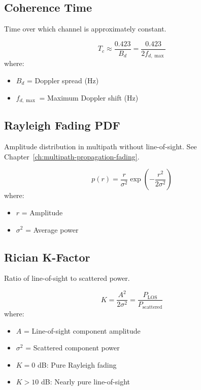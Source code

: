 \subsection{Coherence Time}
\label{sec:coherence-time}

Time over which channel is approximately constant.

\begin{equation}
T_c \approx \frac{0.423}{B_d} = \frac{0.423}{2f_{d,\max}}
\label{eq:coherence-time}
\end{equation}
where:
\begin{itemize}
\item $B_d$ = Doppler spread (Hz)
\item $f_{d,\max}$ = Maximum Doppler shift (Hz)
\end{itemize}

\subsection{Rayleigh Fading PDF}
\label{sec:rayleigh-fading}

Amplitude distribution in multipath without line-of-sight. See Chapter~\ref{ch:multipath-propagation-fading}.

\begin{equation}
p(r) = \frac{r}{\sigma^2} \exp\left(-\frac{r^2}{2\sigma^2}\right)
\label{eq:rayleigh-pdf}
\end{equation}
where:
\begin{itemize}
\item $r$ = Amplitude
\item $\sigma^2$ = Average power
\end{itemize}

\subsection{Rician K-Factor}
\label{sec:rician-k}

Ratio of line-of-sight to scattered power.

\begin{equation}
K = \frac{A^2}{2\sigma^2} = \frac{P_{\text{LOS}}}{P_{\text{scattered}}}
\label{eq:rician-k}
\end{equation}
where:
\begin{itemize}
\item $A$ = Line-of-sight component amplitude
\item $\sigma^2$ = Scattered component power
\item $K = 0$ dB: Pure Rayleigh fading
\item $K > 10$ dB: Nearly pure line-of-sight
\end{itemize}

